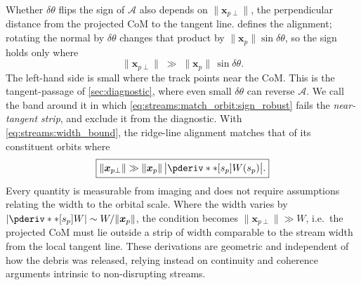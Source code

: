 \documentclass[linenumbers,twocolumn]{aastex701}
\renewcommand{\mbf}[1]{\boldsymbol{#1}}
\newcommand{\xvec}{\mbf{x}}  %
\newcommand{\sarc}{s}  %
\newcommand{\proj}[1]{{#1}_{p}}  %
\newcommand{\projperp}[1]{{#1}_{p \perp}}  %
\newcommand{\xsky}{\proj{\xvec}}  %
\newcommand{\xskyperp}{\projperp{\xvec}}
\newcommand{\ssky}{\proj{\sarc}} %
\begin{document}
        Whether $\delta\theta$ flips the sign of $\mathcal{A}$ also depends on $\|\xskyperp\|$, the perpendicular distance from the projected \gls{CoM} to the tangent line. %
         defines the alignment; rotating the normal by $\delta\theta$ changes that product by $\|\xsky\|\sin\delta\theta$, so the sign holds only where %
        \begin{equation}\label{eq:streams:match_orbit:sign_robust}
            \|\xskyperp\|
            \;\gg\;
            \|\xsky\|\,\sin\delta\theta . %
        \end{equation}
        The left-hand side is small where the track points near the \gls{CoM}. %
        This is the tangent-passage of \autoref{sec:diagnostic}, where even small $\delta\theta$ can reverse $\mathcal{A}$. %
        We call the band around it in which \cref{eq:streams:match_orbit:sign_robust} fails the \emph{near-tangent strip}, and exclude it from the diagnostic. %
        With \cref{eq:streams:width_bound}, the ridge-line alignment matches that of its constituent orbits where %
        \begin{equation}\label{eq:streams:match_orbit:transfer}
            \boxed{
            \|\xskyperp\| \gg \|\xsky\|\,\bigl|\pderiv**[\ssky]W(\ssky)\bigr|.
            }
        \end{equation}
        Every quantity is measurable from imaging and does not require assumptions relating the width to the orbital scale. %
        Where the width varies by $|\pderiv**[\ssky]{W}| \sim W/\|\xsky\|$, the condition becomes $\|\xskyperp\| \gg W$, i.e.\ the projected \gls{CoM} must lie outside a strip of width comparable to the stream width from the local tangent line. %
        These derivations are geometric and independent of how the debris was released, relying instead on continuity and coherence arguments intrinsic to non-disrupting streams. %
\end{document}
